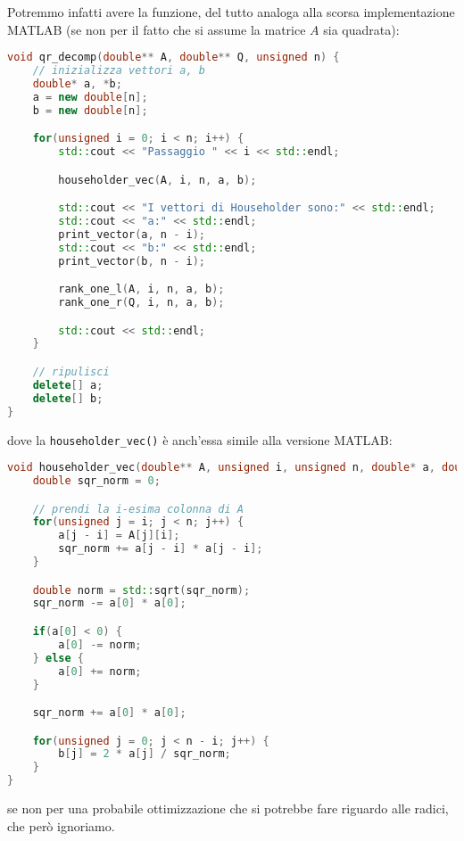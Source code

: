 \documentclass[a4paper,11pt]{article}
\begin{document}
Potremmo infatti avere la funzione, del tutto analoga alla scorsa implementazione MATLAB (se non per il fatto che si assume la matrice $A$ sia quadrata):
\begin{lstlisting}[language=C++, style=codestyle]	
void qr_decomp(double** A, double** Q, unsigned n) {
	// inizializza vettori a, b
	double* a, *b;
	a = new double[n];
	b = new double[n];

	for(unsigned i = 0; i < n; i++) {
		std::cout << "Passaggio " << i << std::endl;

		householder_vec(A, i, n, a, b);

		std::cout << "I vettori di Householder sono:" << std::endl;
		std::cout << "a:" << std::endl;
		print_vector(a, n - i);
		std::cout << "b:" << std::endl;
		print_vector(b, n - i);

		rank_one_l(A, i, n, a, b);
		rank_one_r(Q, i, n, a, b);

		std::cout << std::endl;
	}

	// ripulisci
	delete[] a;
	delete[] b;
}
\end{lstlisting}
dove la \lstinline|householder_vec()| è anch'essa simile alla versione MATLAB:
\begin{lstlisting}[language=C++, style=codestyle]	
void householder_vec(double** A, unsigned i, unsigned n, double* a, double* b) {
	double sqr_norm = 0;

	// prendi la i-esima colonna di A
	for(unsigned j = i; j < n; j++) {
		a[j - i] = A[j][i];
		sqr_norm += a[j - i] * a[j - i];
	}

	double norm = std::sqrt(sqr_norm);
	sqr_norm -= a[0] * a[0];

	if(a[0] < 0) {
		a[0] -= norm;
	} else {
		a[0] += norm;
	}

	sqr_norm += a[0] * a[0];

	for(unsigned j = 0; j < n - i; j++) {
		b[j] = 2 * a[j] / sqr_norm;
	}
}
\end{lstlisting}
se non per una probabile ottimizzazione che si potrebbe fare riguardo alle radici, che però ignoriamo.
\end{document}
